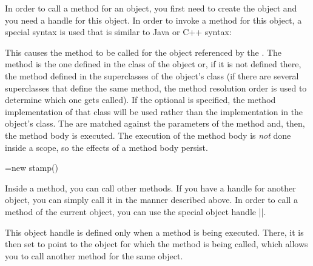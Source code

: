 In order to call a method for an object, you first need to create the
object and you need a handle for this object. In order to invoke a
method for this object, a special syntax is used that is similar to
Java or C++ syntax:

\begin{pgfmanualentry}
  \pgfmanualbody
  This causes the method  to be called for the
  object referenced by the . The method is the one
  defined in the class of the object or, if it is not defined there,
  the method defined in the superclasses of the object's class (if
  there are several superclasses that define the same method, the
  method resolution order is used to determine which one gets
  called). If the optional  is specified, the method
  implementation of that class will be used rather than the
  implementation in the object's class. The  
  are matched against the parameters of the method and, then, the
  method body is executed. The execution of the method body is
  \emph{not} done inside a scope, so the effects of a method body
  persist.

\begin{codeexample}

\pgfoonew \mystamp=new stamp()

\end{codeexample}

  Inside a method, you can call other methods. If you have a handle
  for another object, you can simply call it in the manner described
  above. In order to call a method of the current object, you can use
  the special object handle |\pgfoothis|.

  \begin{command}{\pgfoothis}
    This object handle is defined only when a method is being
    executed. There, it is then set to point to the object for which
    the method is being called, which allows you to call another
    method for the same object.


\end{command}
\end{pgfmanualentry}
